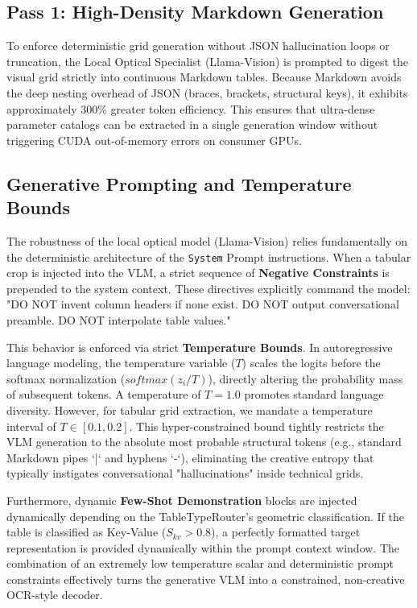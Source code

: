 \subsection{Pass 1: High-Density Markdown Generation}
To enforce deterministic grid generation without JSON hallucination loops or truncation, the Local Optical Specialist (Llama-Vision) is prompted to digest the visual grid strictly into continuous Markdown tables. Because Markdown avoids the deep nesting overhead of JSON (braces, brackets, structural keys), it exhibits approximately 300\% greater token efficiency. This ensures that ultra-dense parameter catalogs can be extracted in a single generation window without triggering CUDA out-of-memory errors on consumer GPUs.

\subsection{Generative Prompting and Temperature Bounds}
\label{subsec:prompting_bounds}

The robustness of the local optical model (Llama-Vision) relies fundamentally on the deterministic architecture of the \texttt{System} Prompt instructions. When a tabular crop is injected into the VLM, a strict sequence of \textbf{Negative Constraints} is prepended to the system context. These directives explicitly command the model: "DO NOT invent column headers if none exist. DO NOT output conversational preamble. DO NOT interpolate table values."

This behavior is enforced via strict \textbf{Temperature Bounds}. In autoregressive language modeling, the temperature variable ($T$) scales the logits before the softmax normalization ($softmax(z_i / T)$), directly altering the probability mass of subsequent tokens. A temperature of $T=1.0$ promotes standard language diversity. However, for tabular grid extraction, we mandate a temperature interval of $T \in [0.1, 0.2]$. This hyper-constrained bound tightly restricts the VLM generation to the absolute most probable structural tokens (e.g., standard Markdown pipes `|` and hyphens `-`), eliminating the creative entropy that typically instigates conversational "hallucinations" inside technical grids.

Furthermore, dynamic \textbf{Few-Shot Demonstration} blocks are injected dynamically depending on the TableTypeRouter's geometric classification. If the table is classified as Key-Value ($S_{kv} > 0.8$), a perfectly formatted target representation is provided dynamically within the prompt context window. The combination of an extremely low temperature scalar and deterministic prompt constraints effectively turns the generative VLM into a constrained, non-creative OCR-style decoder.

